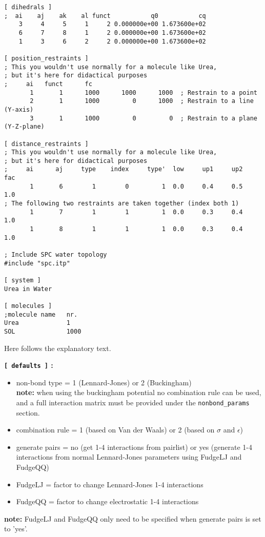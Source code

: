 {\begin{verbatim}
[ dihedrals ]
;  ai    aj    ak    al funct           q0           cq
    3     4     5     1     2 0.000000e+00 1.673600e+02 
    6     7     8     1     2 0.000000e+00 1.673600e+02 
    1     3     6     2     2 0.000000e+00 1.673600e+02 
 
[ position_restraints ]
; This you wouldn't use normally for a molecule like Urea,
; but it's here for didactical purposes
;     ai   funct      fc
       1       1      1000      1000      1000  ; Restrain to a point
       2       1      1000         0      1000  ; Restrain to a line (Y-axis)
       3       1      1000         0         0  ; Restrain to a plane (Y-Z-plane)
   
[ distance_restraints ]
; This you wouldn't use normally for a molecule like Urea,
; but it's here for didactical purposes
;     ai      aj     type    index     type'  low     up1     up2     fac
       1       6        1        0         1  0.0     0.4     0.5     1.0 
; The following two restraints are taken together (index both 1)
       1       7        1        1         1  0.0     0.3     0.4     1.0 
       1       8        1        1         1  0.0     0.3     0.4     1.0 

; Include SPC water topology
#include "spc.itp"

[ system ]
Urea in Water

[ molecules ]
;molecule name   nr.
Urea             1
SOL              1000
\end{verbatim}}
Here follows the explanatory text.

{\bf \verb'[ defaults ]' :}
\begin{itemize}
\item non-bond type = 1 (Lennard-Jones) or 2 (Buckingham)\\
{\bf note:} when using the buckingham potential no combination rule can
be used, and a full interaction matrix must be provided under the 
{\tt nonbond\_params} section.
\item combination rule = 1 (based on Van der Waals) or 2 (based on
$\sigma$ and $\epsilon$)
\item generate pairs = no (get 1-4 interactions from pairlist) or yes
(generate 1-4 interactions from normal Lennard-Jones parameters using
FudgeLJ and FudgeQQ)
\item FudgeLJ = factor to change Lennard-Jones 1-4 interactions
\item FudgeQQ = factor to change electrostatic 1-4 interactions
\end{itemize}
{\bf note:} FudgeLJ and FudgeQQ only need to be specified when
generate pairs is set to 'yes'.

